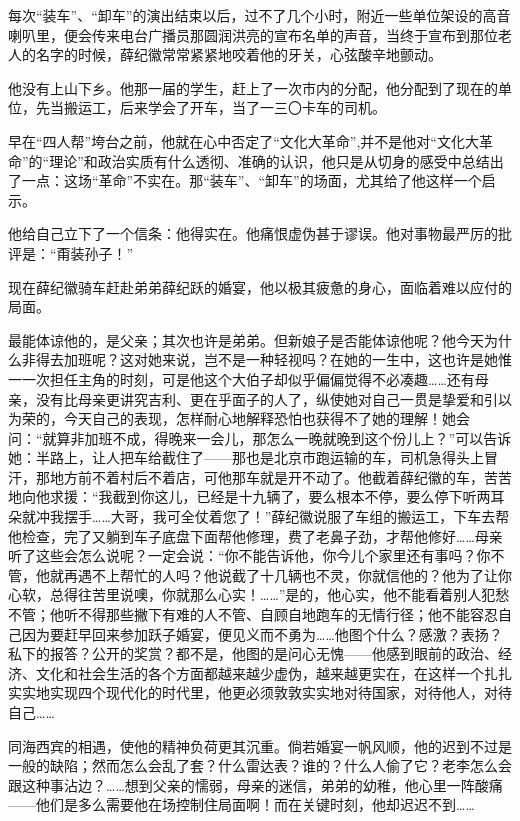 \par 每次“装车”、“卸车”的演出结束以后，过不了几个小时，附近一些单位架设的高音喇叭里，便会传来电台广播员那圆润洪亮的宣布名单的声音，当终于宣布到那位老人的名字的时候，薛纪徽常常紧紧地咬着他的牙关，心弦酸辛地颤动。
\par 他没有上山下乡。他那一届的学生，赶上了一次市内的分配，他分配到了现在的单位，先当搬运工，后来学会了开车，当了一三〇卡车的司机。
\par 早在“四人帮”垮台之前，他就在心中否定了“文化大革命”,并不是他对“文化大革命”的“理论”和政治实质有什么透彻、准确的认识，他只是从切身的感受中总结出了一点：这场“革命”不实在。那“装车”、“卸车”的场面，尤其给了他这样一个启示。
\par 他给自己立下了一个信条：他得实在。他痛恨虚伪甚于谬误。他对事物最严厉的批评是：“甭装孙子！”
\par 现在薛纪徽骑车赶赴弟弟薛纪跃的婚宴，他以极其疲惫的身心，面临着难以应付的局面。
\par 最能体谅他的，是父亲；其次也许是弟弟。但新娘子是否能体谅他呢？他今天为什么非得去加班呢？这对她来说，岂不是一种轻视吗？在她的一生中，这也许是她惟一一次担任主角的时刻，可是他这个大伯子却似乎偏偏觉得不必凑趣……还有母亲，没有比母亲更讲究吉利、更在乎面子的人了，纵使她对自己一贯是挚爱和引以为荣的，今天自己的表现，怎样耐心地解释恐怕也获得不了她的理解！她会问：“就算非加班不成，得晚来一会儿，那怎么一晚就晚到这个份儿上？”可以告诉她：半路上，让人把车给截住了——那也是北京市跑运输的车，司机急得头上冒汗，那地方前不着村后不着店，可他那车就是开不动了。他截着薛纪徽的车，苦苦地向他求援：“我截到你这儿，已经是十九辆了，要么根本不停，要么停下听两耳朵就冲我摆手……大哥，我可全仗着您了！”薛纪徽说服了车组的搬运工，下车去帮他检查，完了又躺到车子底盘下面帮他修理，费了老鼻子劲，才帮他修好……母亲听了这些会怎么说呢？一定会说：“你不能告诉他，你今儿个家里还有事吗？你不管，他就再遇不上帮忙的人吗？他说截了十几辆也不灵，你就信他的？他为了让你心软，总得往苦里说噢，你就那么心实！……”是的，他心实，他不能看着别人犯愁不管；他听不得那些撇下有难的人不管、自顾自地跑车的无情行径；他不能容忍自己因为要赶早回来参加跃子婚宴，便见义而不勇为……他图个什么？感激？表扬？私下的报答？公开的奖赏？都不是，他图的是问心无愧——他感到眼前的政治、经济、文化和社会生活的各个方面都越来越少虚伪，越来越更实在，在这样一个扎扎实实地实现四个现代化的时代里，他更必须敦敦实实地对待国家，对待他人，对待自己……
\par 同海西宾的相遇，使他的精神负荷更其沉重。倘若婚宴一帆风顺，他的迟到不过是一般的缺陷；然而怎么会乱了套？什么雷达表？谁的？什么人偷了它？老李怎么会跟这种事沾边？……想到父亲的懦弱，母亲的迷信，弟弟的幼稚，他心里一阵酸痛——他们是多么需要他在场控制住局面啊！而在关键时刻，他却迟迟不到……
